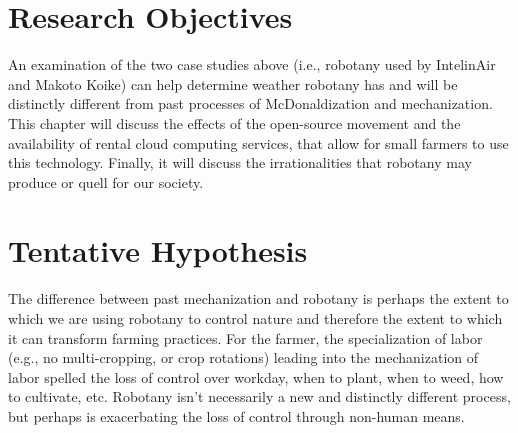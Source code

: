 \section{Research Objectives} 
An examination of the two case studies above (i.e., robotany used by IntelinAir and Makoto Koike) can help determine weather robotany has and will be distinctly different from past processes of McDonaldization and mechanization. This chapter will discuss the effects of the open-source movement and the availability of rental cloud computing services, that allow for small farmers to use this technology. Finally, it will discuss the irrationalities that robotany may produce or quell for our society.  
	
\section{Tentative Hypothesis} 
The difference between past mechanization and robotany is perhaps the extent to which we are using robotany to control nature and therefore the extent to which it can transform farming practices. For the farmer, the specialization of labor (e.g., no multi-cropping, or crop rotations) leading into the mechanization of labor spelled the loss of control over workday, when to plant, when to weed, how to cultivate, etc. Robotany isn't necessarily a new and distinctly different process, but perhaps is exacerbating the loss of control through non-human means.

